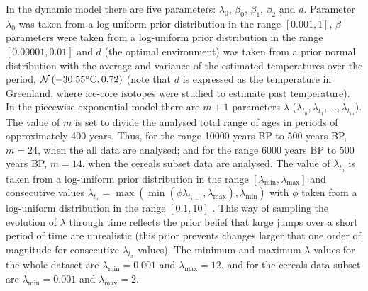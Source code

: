 \documentclass[a4paper]{article}
\begin{document}
In the dynamic model there are five parameters: $\lambda_0$, $\beta_0$, $\beta_1$, $\beta_2$ and $d$. Parameter $\lambda_0$ was taken from a log-uniform prior distribution in the range $\left[ 0.001,1\right]$, $\beta$ parameters were taken from a log-uniform prior distribution in the range $\left[ 0.00001,0.01\right]$ and $d$ (the optimal environment) was taken from a prior normal distribution with the average and variance of the estimated temperatures over the period, $\mathcal{N}\left(-30.55\mathrm{\degree C},0.72\right)$ (note that $d$ is expressed as the temperature in Greenland, where ice-core isotopes were studied to estimate past temperature).
\\



In the piecewise exponential model there are $m+1$ parameters $\lambda$ ($\lambda_{t_0},\lambda_{t_1},\dots ,\lambda_{t_{m}}$). The value of $m$ is set to divide the analysed total range of ages in periods of approximately 400 years. Thus, for the range 10000 years BP to 500 years BP, $m=24$, when the all data are analysed; and for the range 6000 years BP to 500 years BP, $m=14$, when the cereals subset data are analysed. The value of $\lambda_{t_0}$ is taken from a log-uniform prior distribution in the range $\left[\lambda_{\min},\lambda_{\max}\right]$ and consecutive values $\lambda_{t_x}=\max(\min(\phi\lambda_{t_{x-1}},\lambda_{\max}),\lambda_{\min})$ with $\phi$ taken from a log-uniform distribution in the range $\left[0.1,10\right]$ \parencite[as in][]{Boitard2016}. This way of sampling the evolution of $\lambda$ through time reflects the prior belief that large jumps over a short period of time are unrealistic (this prior prevents changes larger that one order of magnitude for consecutive $\lambda_{t_x}$ values). The minimum and maximum  $\lambda$ values for the whole dataset are $\lambda_{\min}=0.001$ and $\lambda_{\max}=12$, and for the cereals data subset are $\lambda_{\min}=0.001$ and $\lambda_{\max}=2$.
\\
\end{document}
